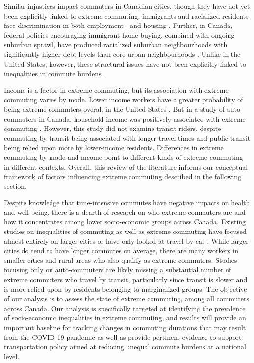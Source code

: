 \documentclass[10 pt,letterpaper]{article}
\begin{document}
Similar injustices impact commuters in Canadian cities, though they have not yet been explicitly linked to extreme commuting: immigrants and racialized residents face discrimination in both employment \cite{galabuzi2006canada,dietz2015skill}, and housing \cite{murdie2002housing}.  Further, in Canada, federal policies encouraging immigrant home-buying, combined with ongoing suburban sprawl, have produced racialized suburban neighbourhoods with significantly higher debt levels than core urban neighbourhoods \cite{simone2019immigration}. Unlike in the United States, however, these structural issues have not been explicitly linked to inequalities in commute burdens.

Income is a factor in extreme commuting, but its association with extreme commuting varies by mode. Lower income workers have a greater probability of being extreme commuters overall in the United States \cite{marion_comparison_2007,bai_exploring_2020}. But in a study of auto commuters in Canada, household income was positively associated with extreme commuting \cite{government_of_canada_daily_2019}. However, this study did not examine transit riders, despite commuting by transit being associated with longer travel times and public transit being relied upon more by lower-income residents.  Differences in extreme commuting by mode and income point to different kinds of extreme commuting in different contexts. Overall, this review of the literature informs our conceptual framework of factors influencing extreme commuting described in the following section.

Despite knowledge that time-intensive commutes have negative impacts on health and well being, there is a dearth of research on who extreme commuters are and how it concentrates among lower socio-economic groups across Canada. Existing studies on inequalities of commuting as well as extreme commuting have focused almost entirely on larger cities \cite{marion_comparison_2007,maoh_determinants_2012-1,vincent-geslin_determinants_2016,bai_exploring_2020} or have only looked at travel by car \cite{marion_comparison_2007,maoh_determinants_2012-1,government_of_canada_daily_2019}. While larger cities do tend to have longer commutes on average, there are many workers in smaller cities and rural areas who also qualify as extreme commuters. Studies focusing only on auto-commuters are likely missing a substantial number of extreme commuters who travel by transit, particularly since transit is slower and is more relied upon by residents belonging to marginalized groups. The objective of our analysis is to assess the state of extreme commuting, among all commuters across Canada. Our analysis is specifically targeted at identifying the prevalence of socio-economic inequalities in extreme commuting, and results will provide an important baseline for tracking changes in commuting durations that may result from the COVID-19 pandemic as well as provide pertinent evidence to support transportation policy aimed at reducing unequal commute burdens at a national level.
\end{document}
